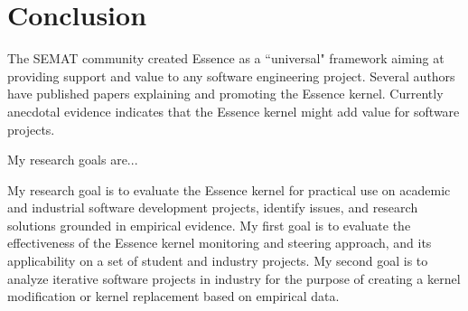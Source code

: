 \documentclass[preprint,12pt,3p]{elsarticle}
\begin{document}


\section{Conclusion}
\label{Conclusions}

The SEMAT community created Essence as a ``universal" framework aiming at providing support and value to any software engineering project. Several authors have published papers explaining and promoting the Essence kernel. Currently anecdotal evidence indicates that the Essence kernel might add value for software projects. 

My research goals are...

My research goal is to evaluate the Essence kernel for practical use on academic and industrial software development projects, identify issues, and research solutions grounded in empirical evidence. My first goal is to evaluate the effectiveness of the Essence kernel monitoring and steering approach, and its applicability on a set of student and industry projects. My second goal is to analyze iterative software projects in industry for the purpose of creating a kernel modification or kernel replacement based on empirical data.
\end{document}
